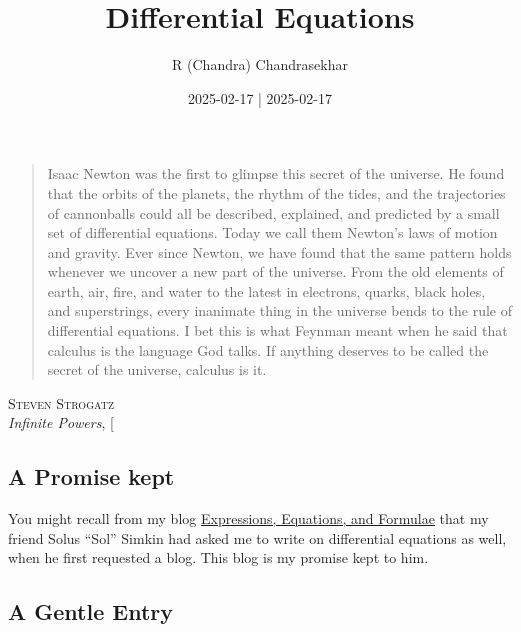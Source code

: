 \documentclass[
  a4paper,
]{article}
\title{Differential Equations}
\author{R (Chandra) Chandrasekhar}
\date{2025-02-17 | 2025-02-17}
\begin{document}
\maketitle

\thispagestyle{empty}


\begin{small}

\begin{quote}
Isaac Newton was the first to glimpse this secret of the universe. He
found that the orbits of the planets, the rhythm of the tides, and the
trajectories of cannonballs could all be described, explained, and
predicted by a small set of differential equations. Today we call them
Newton's laws of motion and gravity. Ever since Newton, we have found
that the same pattern holds whenever we uncover a new part of the
universe. From the old elements of earth, air, fire, and water to the
latest in electrons, quarks, black holes, and superstrings, every
inanimate thing in the universe bends to the rule of differential
equations. I bet this is what Feynman meant when he said that calculus
is the language God talks. If anything deserves to be called the secret
of the universe, calculus is it.
\end{quote}

\end{small}

\begin{flushright}

\begin{footnotesize}

\textsc{Steven Strogatz}\\
\emph{Infinite Powers}, {[}\citeproc{ref-strogatz-2019}{1}{]}

\end{footnotesize}

\end{flushright}

\subsection{A Promise kept}\label{a-promise-kept}

You might recall from my blog
\href{https://swanlotus.netlify.app/blogs/expressions-equations-and-formulae}{Expressions,
Equations, and Formulae} that my friend Solus ``Sol'' Simkin had asked
me to write on differential equations as well, when he first requested a
blog. This blog is my promise kept to him.

\subsection{A Gentle Entry}\label{a-gentle-entry}
\end{document}
